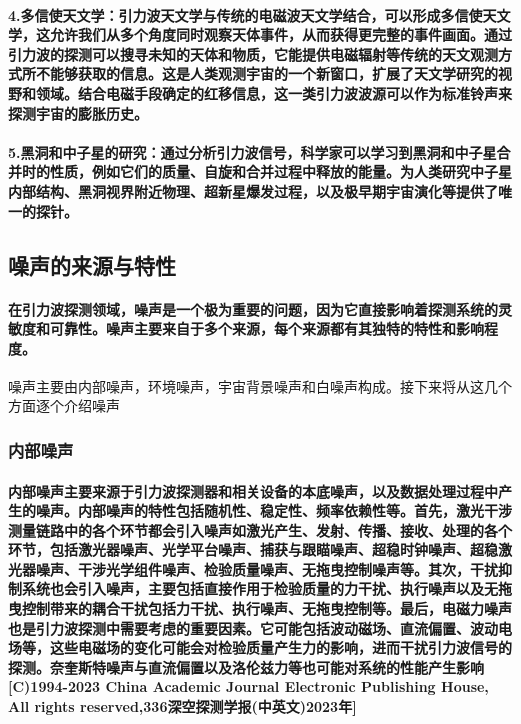 \documentclass{article}
\begin{document}
\paragraph{4.多信使天文学：引力波天文学与传统的电磁波天文学结合，可以形成多信使天文学，这允许我们从多个角度同时观察天体事件，从而获得更完整的事件画面。通过引力波的探测可以搜寻未知的天体和物质，它能提供电磁辐射等传统的天文观测方式所不能够获取的信息。这是人类观测宇宙的一个新窗口，扩展了天文学研究的视野和领域。结合电磁手段确定的红移信息，这一类引力波波源可以作为标准铃声来探测宇宙的膨胀历史。}
\paragraph{5.黑洞和中子星的研究：\textbf{通过分析引力波信号，科学家可以学习到黑洞和中子星合并时的性质，例如它们的质量、自旋和合并过程中释放的能量。为人类研究中子星内部结构、黑洞视界附近物理、超新星爆发过程，以及极早期宇宙演化等提供了唯一的探针。}}

\subsection{噪声的来源与特性}
\paragraph{在引力波探测领域，噪声是一个极为重要的问题，因为它直接影响着探测系统的灵敏度和可靠性。噪声主要来自于多个来源，每个来源都有其独特的特性和影响程度。}
噪声主要由内部噪声，环境噪声，宇宙背景噪声和白噪声构成。接下来将从这几个方面逐个介绍噪声
\subsubsection{内部噪声}
\paragraph{内部噪声主要来源于引力波探测器和相关设备的本底噪声，以及数据处理过程中产生的噪声。内部噪声的特性包括随机性、稳定性、频率依赖性等。首先，激光干涉测量链路中的各个环节都会引入噪声如激光产生、发射、传播、接收、处理的各个环节，包括激光器噪声、光学平台噪声、捕获与跟瞄噪声、超稳时钟噪声、超稳激光器噪声、干涉光学组件噪声、检验质量噪声、无拖曳控制噪声等。其次，干扰抑制系统也会引入噪声，主要包括直接作用于检验质量的力干扰、执行噪声以及无拖曳控制带来的耦合干扰包括力干扰、执行噪声、无拖曳控制等。最后，电磁力噪声也是引力波探测中需要考虑的重要因素。它可能包括波动磁场、直流偏置、波动电场等，这些电磁场的变化可能会对检验质量产生力的影响，进而干扰引力波信号的探测。奈奎斯特噪声与直流偏置以及洛伦兹力等也可能对系统的性能产生影响[C)1994-2023 China Academic Journal Electronic Publishing House, All rights reserved,336深空探测学报(中英文)2023年]}
\end{document}
